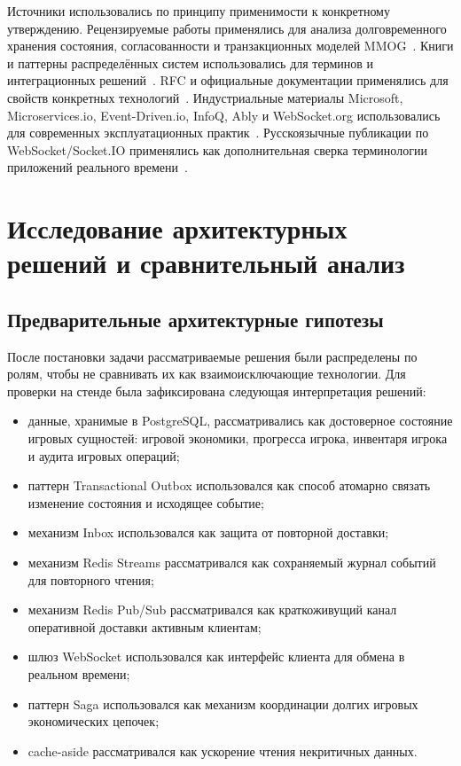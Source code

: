 \documentclass[a4paper,14pt]{extarticle}
\numberwithin{figure}{section}
\numberwithin{table}{section}
\begin{document}
Источники использовались по принципу применимости к конкретному утверждению. Рецензируемые работы применялись для анализа долговременного хранения состояния, согласованности и транзакционных моделей MMOG~\cite{kasenides2019mmog,zhang2008persistence,zhang2011transactions,palant2006consistency,li2004continuous,diao2013consistency}. Книги и паттерны распределённых систем использовались для терминов и интеграционных решений~\cite{kleppmann2017ddia,hohpe2004eip,eipIdempotentReceiver,eipCorrelationIdentifier,vogels2009eventual}. RFC и официальные документации применялись для свойств конкретных технологий~\cite{rfc6455,redis2026streams,redis2026pubsub,postgres2026ha,postgres2026partitioning}. Индустриальные материалы Microsoft, Microservices.io, Event-Driven.io, InfoQ, Ably и WebSocket.org использовались для современных эксплуатационных практик~\cite{microsoft2026eventdriven,richardson2026outbox,dudycz2020outbox,microsoft2026saga,morling2021saga,ably2024websocket,oriordan2024websockets}. Русскоязычные публикации по WebSocket/Socket.IO применялись как дополнительная сверка терминологии приложений реального времени~\cite{alpatov2024socketio,fedulov2025websocket}.

\clearpage
\section{Исследование архитектурных решений и сравнительный анализ}
\label{sec:stage3}

\subsection{Предварительные архитектурные гипотезы}
После постановки задачи рассматриваемые решения были распределены по ролям, чтобы не сравнивать их как взаимоисключающие технологии. Для проверки на стенде была зафиксирована следующая интерпретация решений:
\begin{itemize}
\item данные, хранимые в PostgreSQL, рассматривались как достоверное состояние игровых сущностей: игровой экономики, прогресса игрока, инвентаря игрока и аудита игровых операций;
\item паттерн Transactional Outbox использовался как способ атомарно связать изменение состояния и исходящее событие;
\item механизм Inbox использовался как защита от повторной доставки;
\item механизм Redis Streams рассматривался как сохраняемый журнал событий для повторного чтения;
\item механизм Redis Pub/Sub рассматривался как краткоживущий канал оперативной доставки активным клиентам;
\item шлюз WebSocket использовался как интерфейс клиента для обмена в реальном времени;
\item паттерн Saga использовался как механизм координации долгих игровых экономических цепочек;
\item cache-aside рассматривался как ускорение чтения некритичных данных.
\end{itemize}
\end{document}
